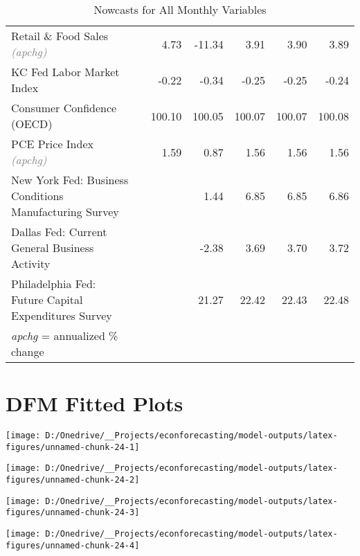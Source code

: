 \documentclass[11pt, letterpaper]{article}\usepackage[]{graphicx}\usepackage[]{color}
\begin{document}
\begin{table}[H]
\begin{tabular}{lrrrrrr}
  Retail \& Food Sales \textit{\footnotesize\textcolor{gray}{(apchg)}} &  & 4.73 & -11.34 & 3.91 & 3.90 & 3.89 \\ 
  KC Fed Labor Market Index &  & -0.22 & -0.34 & -0.25 & -0.25 & -0.24 \\ 
  Consumer Confidence (OECD) &  & 100.10 & 100.05 & 100.07 & 100.07 & 100.08 \\ 
  PCE Price Index \textit{\footnotesize\textcolor{gray}{(apchg)}} &  & 1.59 & 0.87 & 1.56 & 1.56 & 1.56 \\ 
  New York Fed: Business Conditions Manufacturing Survey &  &  & 1.44 & 6.85 & 6.85 & 6.86 \\ 
  Dallas Fed: Current General Business Activity &  &  & -2.38 & 3.69 & 3.70 & 3.72 \\ 
  Philadelphia Fed: Future Capital Expenditures Survey &  &  & 21.27 & 22.42 & 22.43 & 22.48 \\ 
   \hline 
 \textit{apchg} = annualized \% change 
\end{tabular}
\endgroup
\caption{Nowcasts for All Monthly Variables} 
\end{table}



\appendix
\appendixpage
\addappheadtotoc

\section{DFM Fitted Plots}


{\centering \texttt{[image: D:/Onedrive/\_\_Projects/econforecasting/model-outputs/latex-figures/unnamed-chunk-24-1]} 

}




{\centering \texttt{[image: D:/Onedrive/\_\_Projects/econforecasting/model-outputs/latex-figures/unnamed-chunk-24-2]} 

}




{\centering \texttt{[image: D:/Onedrive/\_\_Projects/econforecasting/model-outputs/latex-figures/unnamed-chunk-24-3]} 

}




{\centering \texttt{[image: D:/Onedrive/\_\_Projects/econforecasting/model-outputs/latex-figures/unnamed-chunk-24-4]} 

}
\end{document}
